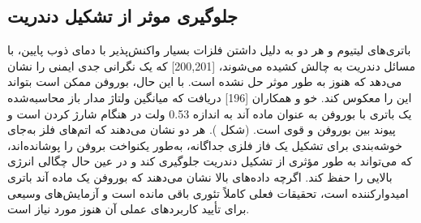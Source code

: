 \subsection{جلوگیری موثر از تشکیل دندریت}
باتری‌های لیتیوم و  هر دو به دلیل داشتن فلزات بسیار واکنش‌پذیر با دمای ذوب پایین، با مسائل دندریت به چالش کشیده می‌شوند، \cite{mortazaviElasticSofteningAlloy2013, chevrierChallengesNaionNegative2011}[200,201] که یک نگرانی جدی ایمنی را نشان می‌دهد که هنوز به طور موثر حل نشده است. با این حال، بوروفن ممکن است بتواند این را معکوس کند. خو و همکاران \cite{shiInitioPredictionBorophene2016}[196] دریافت که میانگین ولتاژ مدار باز محاسبه‌شده یک باتری  با بوروفن به عنوان ماده آند به اندازه 0.53 ولت در هنگام شارژ کردن است و پیوند بین بوروفن و  قوی است. (شکل ). هر دو نشان می‌دهند که اتم‌های فلز به‌جای خوشه‌بندی برای تشکیل یک فاز فلزی جداگانه، به‌طور یکنواخت بروفن را پوشانده‌اند، که می‌تواند به طور مؤثری از تشکیل دندریت جلوگیری کند و در عین حال چگالی انرژی بالایی را حفظ کند. اگرچه داده‌های بالا نشان می‌دهند که بوروفن یک ماده آند باتری امیدوارکننده است، تحقیقات فعلی کاملاً تئوری باقی مانده است و آزمایش‌های وسیعی برای تأیید کاربردهای عملی آن هنوز مورد نیاز است.
